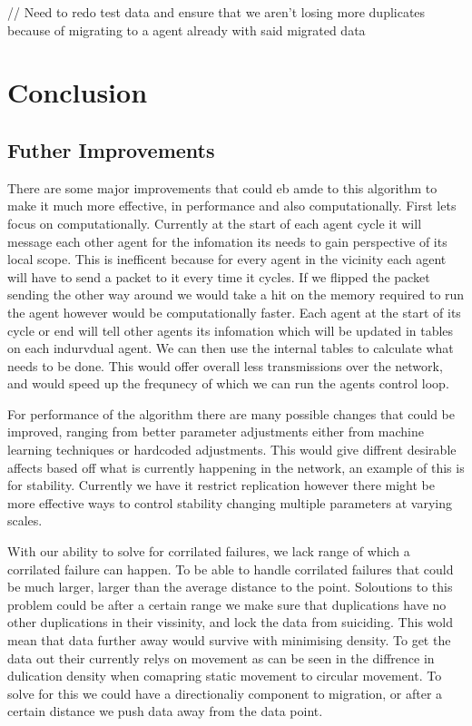 \documentclass{UoYCSproject}
\begin{document}
// Need to redo test data and ensure that we aren't losing more duplicates because of migrating to a agent already with said migrated data



\chapter{Conclusion}
\label{cha:conclusion}

\section{Futher Improvements}
\label{sec:further}

There are some major improvements that could eb amde to this algorithm to make it much more effective, in performance and also computationally.
First lets focus on computationally.
Currently at the start of each agent cycle it will message each other agent for the infomation its needs to gain perspective of its local scope.
This is inefficent because for every agent in the vicinity each agent will have to send a packet to it every time it cycles.
If we flipped the packet sending the other way around we would take a hit on the memory required to run the agent however would be computationally faster.
Each agent at the start of its cycle or end will tell other agents its infomation which will be updated in tables on each indurvdual agent.
We can then use the internal tables to calculate what needs to be done.
This would offer overall less transmissions over the network, and would speed up the frequnecy of which we can run the agents control loop.

For performance of the algorithm there are many possible changes that could be improved, ranging from better parameter adjustments either from machine learning techniques or hardcoded adjustments.
This would give diffrent desirable affects based off what is currently happening in the network, an example of this is for stability.
Currently we have it restrict replication however there might be more effective ways to control stability changing multiple parameters at varying scales.

With our ability to solve for corrilated failures, we lack range of which a corrilated failure can happen.
To be able to handle corrilated failures that could be much larger, larger than the average distance to the point.
Soloutions to this problem could be after a certain range we make sure that duplications have no other duplications in their vissinity, and lock the data from suiciding.
This wold mean that data further away would survive with minimising density.
To get the data out their currently relys on movement as can be seen in the diffrence in dulication density when comapring static movement to circular movement.
To solve for this we could have a directionaliy component to migration, or after a certain distance we push data away from the data point.
\end{document}
